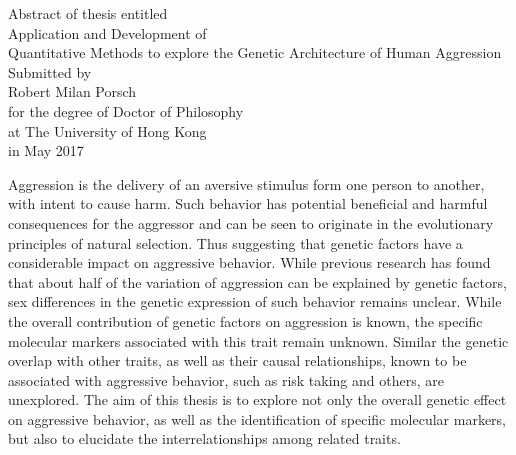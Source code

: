 \documentclass[header.tex]{subfiles}
\begin{document}
\begin{center}
  Abstract of thesis entitled \\
  \vspace*{\baselineskip}
  {\LARGE Application and Development of \\ Quantitative Methods to explore the Genetic Architecture of Human Aggression}\\[0.2\baselineskip]
  \vspace*{\baselineskip}
  Submitted by\\
  \vspace*{\baselineskip}
  {\LARGE Robert Milan Porsch}\\
  \vspace*{\baselineskip}
  for the degree of Doctor of Philosophy \\ at The University of Hong Kong \\ in May 2017
\end{center}


Aggression is the delivery of an aversive stimulus form one person to another, with intent to cause harm.
Such behavior has potential beneficial and harmful consequences for the aggressor and can be seen to originate in the evolutionary principles of natural selection.
Thus suggesting that genetic factors have a considerable impact on aggressive behavior.
While previous research has found that about half of the variation of aggression can be explained by genetic factors, sex differences in the genetic expression of such behavior remains unclear.
While the overall contribution of genetic factors on aggression is known, the specific molecular markers associated with this trait remain unknown.
Similar the genetic overlap with other traits, as well as their causal relationships, known to be associated with aggressive behavior, such as risk taking and others, are unexplored.
The aim of this thesis is to explore not only the overall genetic effect on aggressive behavior, as well as the identification of specific molecular markers, but also to elucidate the interrelationships among related traits. 
\end{document}
